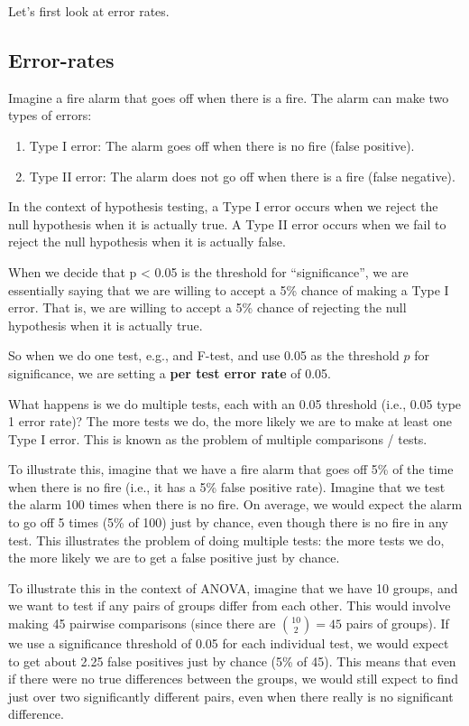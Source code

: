\documentclass[
  letterpaper,
  8pt,
  a4paper]{book}
\providecommand{\tightlist}{%
  \setlength{\itemsep}{0pt}\setlength{\parskip}{0pt}}
\begin{document}
Let's first look at error rates.

\subsection*{Error-rates}\label{error-rates}

Imagine a fire alarm that goes off when there is a fire. The alarm can
make two types of errors:

\begin{enumerate}
\def\labelenumi{\arabic{enumi}.}
\tightlist
\item
  Type I error: The alarm goes off when there is no fire (false
  positive).
\item
  Type II error: The alarm does not go off when there is a fire (false
  negative).
\end{enumerate}

In the context of hypothesis testing, a Type I error occurs when we
reject the null hypothesis when it is actually true. A Type II error
occurs when we fail to reject the null hypothesis when it is actually
false.

When we decide that p \textless{} 0.05 is the threshold for
``significance'', we are essentially saying that we are willing to
accept a 5\% chance of making a Type I error. That is, we are willing to
accept a 5\% chance of rejecting the null hypothesis when it is actually
true.

So when we do one test, e.g., and F-test, and use 0.05 as the threshold
\(p\) for significance, we are setting a \textbf{per test error rate} of
0.05.

What happens is we do multiple tests, each with an 0.05 threshold (i.e.,
0.05 type 1 error rate)? The more tests we do, the more likely we are to
make at least one Type I error. This is known as the problem of multiple
comparisons / tests.

To illustrate this, imagine that we have a fire alarm that goes off 5\%
of the time when there is no fire (i.e., it has a 5\% false positive
rate). Imagine that we test the alarm 100 times when there is no fire.
On average, we would expect the alarm to go off 5 times (5\% of 100)
just by chance, even though there is no fire in any test. This
illustrates the problem of doing multiple tests: the more tests we do,
the more likely we are to get a false positive just by chance.

To illustrate this in the context of ANOVA, imagine that we have 10
groups, and we want to test if any pairs of groups differ from each
other. This would involve making 45 pairwise comparisons (since there
are \(\binom{10}{2} = 45\) pairs of groups). If we use a significance
threshold of 0.05 for each individual test, we would expect to get about
2.25 false positives just by chance (5\% of 45). This means that even if
there were no true differences between the groups, we would still expect
to find just over two significantly different pairs, even when there
really is no significant difference.
\end{document}
